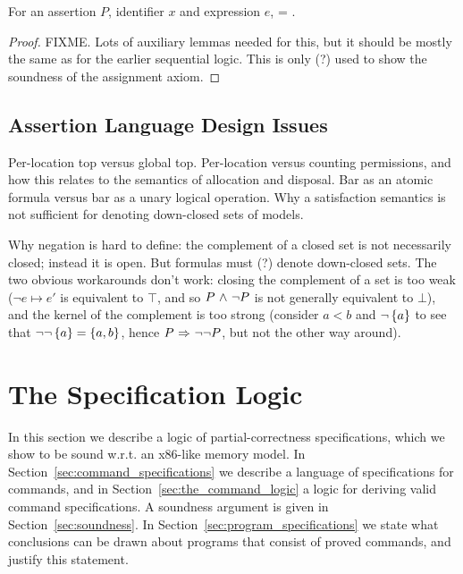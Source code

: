 \documentclass[11pt]{report}
\begin{document}
\begin{lemma}[Substitution]
	\label{lem:substitution-unsubstitution}
	For an assertion $P$, identifier $x$ and expression $e$,  = . 
\end{lemma}

\begin{proof}
	FIXME. Lots of auxiliary lemmas needed for this, but it should be mostly the same as for the earlier sequential logic. This is only (?) used to show the soundness of the assignment axiom.  
\end{proof}



\section{Assertion Language Design Issues} %
\label{sec:assertion_language_design_issues}

Per-location top versus global top. Per-location versus counting permissions, and how this relates to the semantics of allocation and disposal. Bar as an atomic formula versus bar as a unary logical operation. Why a satisfaction semantics is not sufficient for denoting down-closed sets of models. 

Why negation is hard to define: the complement of a closed set is not necessarily closed; instead it is open. But formulas must (?) denote down-closed sets. The two obvious workarounds don't work: closing the complement of a set is too weak ($\neg e \mapsto e'$ is equivalent to $\top$, and so $P \operatorname{\,\wedge\,} \neg P$ is not generally equivalent to $\bot$), and the kernel 
of the complement is too strong (consider $a < b$ and $\neg \left\lbrace a \right\rbrace$ to see that $\neg \neg \left\lbrace a \right\rbrace = \left\lbrace a,b \right\rbrace$, hence $P \operatorname{\,\Rightarrow\,} \neg\neg P$, but not the other way around). 

\chapter{The Specification Logic}

In this section we describe a logic of partial-correctness specifications, which we show to be sound w.r.t. an x86-like memory model. In Section~\ref{sec:command_specifications} we describe a language of specifications for commands, and in Section~\ref{sec:the_command_logic} a logic for deriving valid command specifications. A soundness argument is given in Section~\ref{sec:soundness}. In Section~\ref{sec:program_specifications} we state what conclusions can be drawn about programs that consist of proved commands, and justify this statement.  
\end{document}
